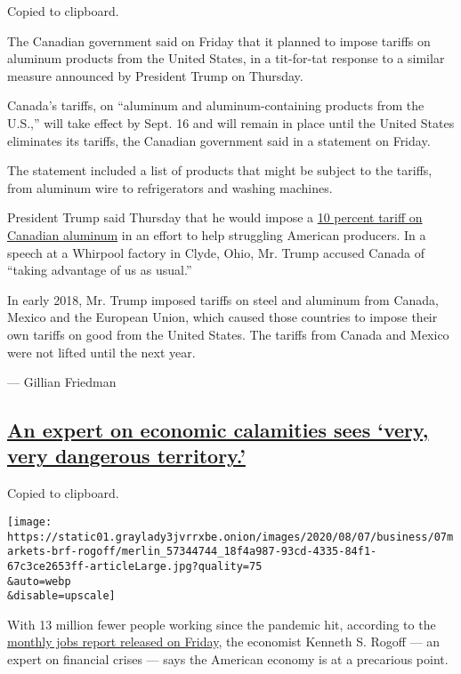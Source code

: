 Copied to clipboard.

The Canadian government said on Friday that it planned to impose tariffs
on aluminum products from the United States, in a tit-for-tat response
to a similar measure announced by President Trump on Thursday.

Canada's tariffs, on ``aluminum and aluminum-containing products from
the U.S.,'' will take effect by Sept. 16 and will remain in place until
the United States eliminates its tariffs, the Canadian government said
in a statement on Friday.

The statement included a list of products that might be subject to the
tariffs, from aluminum wire to refrigerators and washing machines.

President Trump said Thursday that he would impose a
\href{https://www.nytimes3xbfgragh.onion/2020/08/06/business/economy/trump-canadian-aluminum-tariffs.html}{10
percent tariff on Canadian aluminum} in an effort to help struggling
American producers. In a speech at a Whirpool factory in Clyde, Ohio,
Mr. Trump accused Canada of ``taking advantage of us as usual.''

In early 2018, Mr. Trump imposed tariffs on steel and aluminum from
Canada, Mexico and the European Union, which caused those countries to
impose their own tariffs on good from the United States. The tariffs
from Canada and Mexico were not lifted until the next year.

--- Gillian Friedman

\hypertarget{an-expert-on-economic-calamities-sees-very-very-dangerous-territory}{%
\subsection{\texorpdfstring{\protect\hyperlink{an-expert-on-economic-calamities-sees-very-very-dangerous-territory}{An
expert on economic calamities sees `very, very dangerous
territory.'}}{An expert on economic calamities sees `very, very dangerous territory.'}}\label{an-expert-on-economic-calamities-sees-very-very-dangerous-territory}}

Copied to clipboard.

\texttt{[image: https://static01.graylady3jvrrxbe.onion/images/2020/08/07/business/07markets-brf-rogoff/merlin\_57344744\_18f4a987-93cd-4335-84f1-67c3ce2653ff-articleLarge.jpg?quality=75\\\&auto=webp\\\&disable=upscale]}

With 13 million fewer people working since the pandemic hit, according
to the \href{https://www.bls.gov/news.release/empsit.nr0.htm}{monthly
jobs report released on Friday}, the economist Kenneth S. Rogoff --- an
expert on financial crises --- says the American economy is at a
precarious point.

